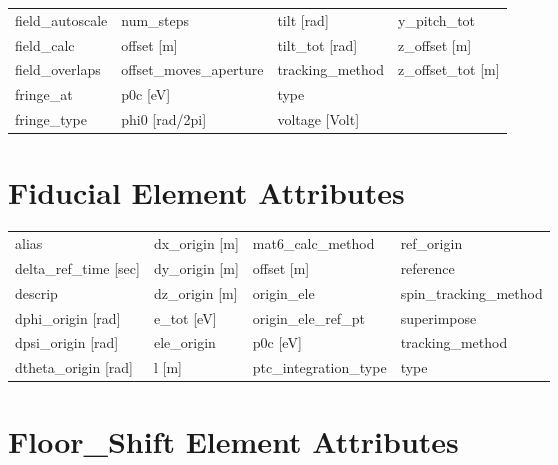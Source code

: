 \begin{tabular}{llll}
field_autoscale                & num_steps                      & tilt [rad]                     & y_pitch_tot                    \\
field_calc                     & offset [m]                     & tilt_tot [rad]                 & z_offset [m]                   \\
field_overlaps                 & offset_moves_aperture          & tracking_method                & z_offset_tot [m]               \\
fringe_at                      & p0c [eV]                       & type                           &                                \\
fringe_type                    & phi0 [rad/2pi]                 & voltage [Volt]                 &                                \\
 \bottomrule
 \end{tabular}
 \vfill

 \section{Fiducial Element Attributes}
 \label{s:list.fiducial}

 \begin{tabular}{llll} \toprule
alias                          & dx_origin [m]                  & mat6_calc_method               & ref_origin                     \\
delta_ref_time [sec]           & dy_origin [m]                  & offset [m]                     & reference                      \\
descrip                        & dz_origin [m]                  & origin_ele                     & spin_tracking_method           \\
dphi_origin [rad]              & e_tot [eV]                     & origin_ele_ref_pt              & superimpose                    \\
dpsi_origin [rad]              & ele_origin                     & p0c [eV]                       & tracking_method                \\
dtheta_origin [rad]            & l [m]                          & ptc_integration_type           & type                           \\
 \bottomrule
 \end{tabular}
 \vfill

 \section{Floor_Shift Element Attributes}
 \label{s:list.floor.shift}

